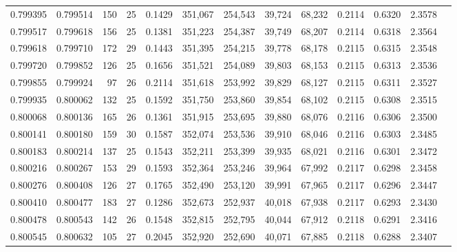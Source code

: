 \begin{tabular}{rrrrrrrrrrrrr}
0.799395 & 0.799514 &   150 &  25 &                                     0.1429 & 351,067 & 254,543 &  39,724 &  68,232 & 0.2114 & 0.6320 & 2.3578 \\
0.799517 & 0.799618 &   156 &  25 &                                     0.1381 & 351,223 & 254,387 &  39,749 &  68,207 & 0.2114 & 0.6318 & 2.3564 \\
0.799618 & 0.799710 &   172 &  29 &                                     0.1443 & 351,395 & 254,215 &  39,778 &  68,178 & 0.2115 & 0.6315 & 2.3548 \\
0.799720 & 0.799852 &   126 &  25 &                                     0.1656 & 351,521 & 254,089 &  39,803 &  68,153 & 0.2115 & 0.6313 & 2.3536 \\
0.799855 & 0.799924 &    97 &  26 &                                     0.2114 & 351,618 & 253,992 &  39,829 &  68,127 & 0.2115 & 0.6311 & 2.3527 \\
0.799935 & 0.800062 &   132 &  25 &                                     0.1592 & 351,750 & 253,860 &  39,854 &  68,102 & 0.2115 & 0.6308 & 2.3515 \\
0.800068 & 0.800136 &   165 &  26 &                                     0.1361 & 351,915 & 253,695 &  39,880 &  68,076 & 0.2116 & 0.6306 & 2.3500 \\
0.800141 & 0.800180 &   159 &  30 &                                     0.1587 & 352,074 & 253,536 &  39,910 &  68,046 & 0.2116 & 0.6303 & 2.3485 \\
0.800183 & 0.800214 &   137 &  25 &                                     0.1543 & 352,211 & 253,399 &  39,935 &  68,021 & 0.2116 & 0.6301 & 2.3472 \\
0.800216 & 0.800267 &   153 &  29 &                                     0.1593 & 352,364 & 253,246 &  39,964 &  67,992 & 0.2117 & 0.6298 & 2.3458 \\
0.800276 & 0.800408 &   126 &  27 &                                     0.1765 & 352,490 & 253,120 &  39,991 &  67,965 & 0.2117 & 0.6296 & 2.3447 \\
0.800410 & 0.800477 &   183 &  27 &                                     0.1286 & 352,673 & 252,937 &  40,018 &  67,938 & 0.2117 & 0.6293 & 2.3430 \\
0.800478 & 0.800543 &   142 &  26 &                                     0.1548 & 352,815 & 252,795 &  40,044 &  67,912 & 0.2118 & 0.6291 & 2.3416 \\
0.800545 & 0.800632 &   105 &  27 &                                     0.2045 & 352,920 & 252,690 &  40,071 &  67,885 & 0.2118 & 0.6288 & 2.3407 \\

\end{tabular}
